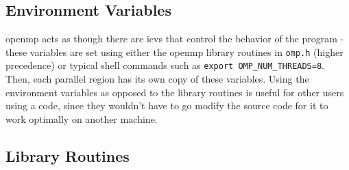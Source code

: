 \documentclass[10pt]{article}
\begin{document}
\begin{flushleft}
\subsection{Environment Variables}

\gls{openmp} acts as though there are \gls{icv}s that control the behavior of the program - these variables are set using either the \gls{openmp} library routines in {\tt omp.h} (higher precedence) or typical shell commands such as {\tt export OMP\_NUM\_THREADS=8}. Then, each parallel region has its own copy of these variables. Using the environment variables as opposed to the library routines is useful for other users using a code, since they wouldn't have to go modify the source code for it to work optimally on another machine.

\subsection{Library Routines}


\end{flushleft}
\end{document}
